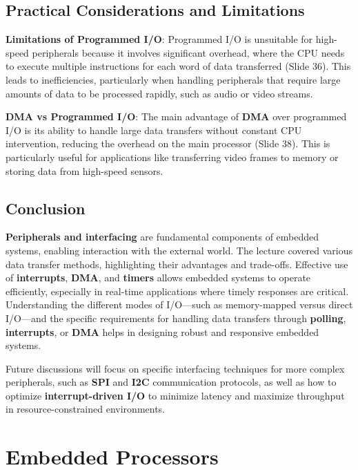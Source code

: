 \documentclass[
  14pt,
  a4paper,
  numbers=noendperiod,
  headinclude=true,
  footinclude=true,
  DIV=calc]{scrreprt}
\begin{document}
\section{Practical Considerations and
Limitations}\label{practical-considerations-and-limitations}

\textbf{Limitations of Programmed I/O}: Programmed I/O is unsuitable for
high-speed peripherals because it involves significant overhead, where
the CPU needs to execute multiple instructions for each word of data
transferred (Slide 36). This leads to inefficiencies, particularly when
handling peripherals that require large amounts of data to be processed
rapidly, such as audio or video streams.

\textbf{DMA vs Programmed I/O}: The main advantage of \textbf{DMA} over
programmed I/O is its ability to handle large data transfers without
constant CPU intervention, reducing the overhead on the main processor
(Slide 38). This is particularly useful for applications like
transferring video frames to memory or storing data from high-speed
sensors.

\section{Conclusion}\label{conclusion-2}

\textbf{Peripherals and interfacing} are fundamental components of
embedded systems, enabling interaction with the external world. The
lecture covered various data transfer methods, highlighting their
advantages and trade-offs. Effective use of \textbf{interrupts},
\textbf{DMA}, and \textbf{timers} allows embedded systems to operate
efficiently, especially in real-time applications where timely responses
are critical. Understanding the different modes of I/O---such as
memory-mapped versus direct I/O---and the specific requirements for
handling data transfers through \textbf{polling}, \textbf{interrupts},
or \textbf{DMA} helps in designing robust and responsive embedded
systems.

Future discussions will focus on specific interfacing techniques for
more complex peripherals, such as \textbf{SPI} and \textbf{I2C}
communication protocols, as well as how to optimize
\textbf{interrupt-driven I/O} to minimize latency and maximize
throughput in resource-constrained environments.

\chapter{Embedded Processors}\label{embedded-processors}
\end{document}
